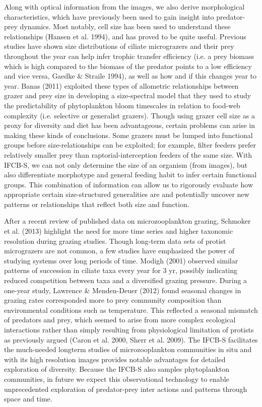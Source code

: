 Along with optical information from the images, we also derive morphological characteristics, which
have previously been used to gain insight into predator-prey dynamics. Most notably, cell size has been used to understand these relationships (Hansen et al. 1994), and has proved to be quite useful. Previous studies have shown size distributions of ciliate micrograzers and their prey throughout the year can help infer trophic transfer efficiency (i.e. a prey biomass which is high compared to the biomass of the predator points to a low efficiency and vice versa, Gaedke \& Straile 1994), as well as how and if this changes year to year. Banas (2011) exploited these types of allometric relationships between grazer and prey size in developing a size-spectral model that they used to study the predictability of phytoplankton bloom timescales in relation to food-web complexity (i.e. selective or generalist grazers). Though using grazer cell size as a proxy for diversity and diet has been advantageous, certain problems can arise in making these kinds of conclusions. Some grazers must be lumped into functional groups before size-relationships can be exploited; for example, filter feeders
prefer relatively smaller prey than raptorial-interception feeders of the same size. With IFCB-S, we can
not only determine the size of an organism (from images), but also differentiate morphotype and general feeding habit to infer certain functional groups. This combination of information can allow us to rigorously evaluate how appropriate certain size-structured generalities are and potentially uncover new patterns or relationships that reflect both size and function.

After a recent review of published data on microzooplankton grazing, Schmoker et al. (2013) highlight the need for more time series and higher taxonomic resolution during grazing studies. Though long-term data sets of protist micrograzers are not common, a few studies have emphasized the power
of studying systems over long periods of time. Modigh (2001) observed similar patterns of succession in ciliate taxa every year for 3 yr, possibly indicating reduced competition between taxa and a diversified grazing pressure. During a one-year study, Lawrence \& Menden-Deuer (2012) found seasonal changes in grazing rates corresponded more to prey community composition than environmental conditions such as temperature. This reflected a seasonal mismatch of predators and prey, which seemed to arise from more complex ecological interactions rather than simply resulting from physiological limitation of protists as previously argued (Caron et al. 2000, Sherr et al.
2009). The IFCB-S facilitates the much-needed longterm studies of microzooplankton communities in situ and with its high resolution images provides notable advantages for detailed exploration of diversity. Because the IFCB-S also samples phytoplankton communities, in future we expect this observational technology to enable unprecedented exploration of predator-prey inter actions and patterns through space and time.




